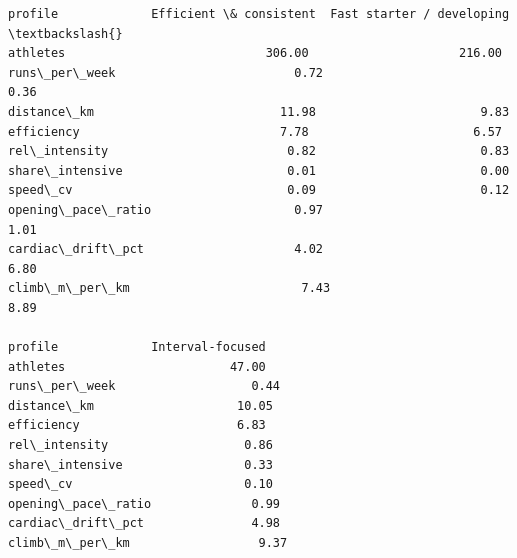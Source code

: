\documentclass[11pt]{article}
\makeatletter
\newcommand{\boxspacing}{\kern\kvtcb@left@rule\kern\kvtcb@boxsep}
\newcommand{\prompt}[4]{
        {\ttfamily\llap{{\color{#2}[#3]:\hspace{3pt}#4}}\vspace{-\baselineskip}}
    }
\makeatother
\begin{document}
            \begin{tcolorbox}[breakable, size=fbox, boxrule=.5pt, pad at break*=1mm, opacityfill=0]
\prompt{Out}{outcolor}{7}{\boxspacing}
\begin{Verbatim}[commandchars=\\\{\}]
profile             Efficient \& consistent  Fast starter / developing  \textbackslash{}
athletes                            306.00                     216.00
runs\_per\_week                         0.72                       0.36
distance\_km                          11.98                       9.83
efficiency                            7.78                       6.57
rel\_intensity                         0.82                       0.83
share\_intensive                       0.01                       0.00
speed\_cv                              0.09                       0.12
opening\_pace\_ratio                    0.97                       1.01
cardiac\_drift\_pct                     4.02                       6.80
climb\_m\_per\_km                        7.43                       8.89

profile             Interval-focused
athletes                       47.00
runs\_per\_week                   0.44
distance\_km                    10.05
efficiency                      6.83
rel\_intensity                   0.86
share\_intensive                 0.33
speed\_cv                        0.10
opening\_pace\_ratio              0.99
cardiac\_drift\_pct               4.98
climb\_m\_per\_km                  9.37
\end{Verbatim}
\end{tcolorbox}
        
\end{document}
